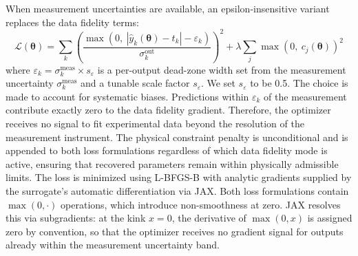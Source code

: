 \documentclass[preprint,review,10pt,number]{elsarticle}
\begin{document}
When measurement uncertainties are available, an epsilon-insensitive 
variant replaces the data fidelity terms:
%
\begin{equation}
    \mathcal{L}(\boldsymbol{\theta}) = 
    \sum_{k} \left( 
    \frac{\max\!\left(0,\ |\hat{y}_k(\boldsymbol{\theta}) - t_k| - 
    \varepsilon_k\right)}{\sigma_k^{\text{out}}} 
    \right)^{\!2}
    + \lambda \sum_{j} \max\!\left(0,\ 
    c_j(\boldsymbol{\theta})\right)^2
    \label{eq:loss_epsilon}
\end{equation}
%
where $\varepsilon_k = \sigma_k^{\text{meas}} \times s_\varepsilon$ is a per-output dead-zone width set from the measurement uncertainty $\sigma_k^{\text{meas}}$ and a tunable scale factor $s_\varepsilon$. 
We set $s_\varepsilon$ to be 0.5.
The choice is made to account for systematic biases.
Predictions within $\varepsilon_k$ of the measurement contribute exactly zero to the data fidelity gradient. Therefore, the optimizer receives no signal to fit experimental data beyond the resolution of the measurement instrument. 
The physical constraint penalty is unconditional and is appended to both loss formulations regardless of which data fidelity mode is active, ensuring that recovered parameters remain within physically admissible limits.
The loss is minimized using L-BFGS-B with analytic gradients supplied by the surrogate's automatic differentiation via JAX. Both loss formulations contain $\max(0, \cdot)$ operations, which introduce non-smoothness at zero. JAX resolves this via subgradients: at the 
kink $x = 0$, the derivative of $\max(0, x)$ is assigned zero by convention, so that the optimizer receives no gradient signal for outputs already within the measurement uncertainty band.
\end{document}
